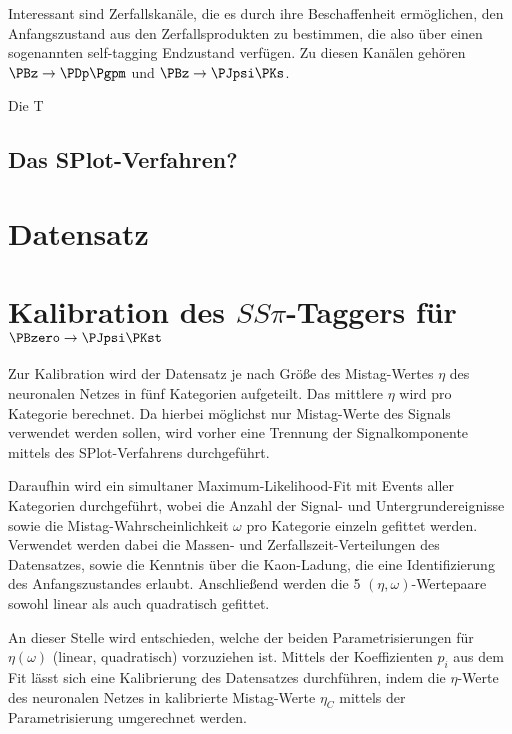 
Interessant sind Zerfallskanäle, die es durch ihre Beschaffenheit ermöglichen, den Anfangszustand aus den Zerfallsprodukten zu bestimmen, die also über einen sogenannten self-tagging Endzustand verfügen.
Zu diesen Kanälen gehören $\PBz \to \PDp\Pgpm$ und $\PBz \to \PJpsi \PKs$.

Die T


\subsection{Das SPlot-Verfahren?}

\section{Datensatz}


\section{\texorpdfstring{Kalibration des $SS\pi$-Taggers für $\PBzero \to \PJpsi \PKst$}{Kalibration des SSpi-Taggers für B0 -> JpsiKst}}

Zur Kalibration wird der Datensatz je nach Größe des Mistag-Wertes $\eta$ des neuronalen Netzes in fünf Kategorien aufgeteilt.
Das mittlere $η$ wird pro Kategorie berechnet.
Da hierbei möglichst nur Mistag-Werte des Signals verwendet werden sollen, wird vorher eine Trennung der Signalkomponente mittels des SPlot-Verfahrens durchgeführt.

Daraufhin wird ein simultaner Maximum-Likelihood-Fit mit Events aller Kategorien durchgeführt, wobei die Anzahl der Signal- und Untergrundereignisse sowie die Mistag-Wahrscheinlichkeit $\omega$ pro Kategorie einzeln gefittet werden.
Verwendet werden dabei die Massen- und Zerfallszeit-Verteilungen des Datensatzes, sowie die Kenntnis über die Kaon-Ladung, die eine Identifizierung des Anfangszustandes erlaubt.
Anschließend werden die 5 $(\eta, \omega)$-Wertepaare sowohl linear als auch quadratisch gefittet.

An dieser Stelle wird entschieden, welche der beiden Parametrisierungen für $\eta(\omega)$ (linear, quadratisch) vorzuziehen ist.
Mittels der Koeffizienten $p_i$ aus dem Fit lässt sich eine Kalibrierung des Datensatzes durchführen, indem die $η$-Werte des neuronalen Netzes in kalibrierte Mistag-Werte $η_C$ mittels der Parametrisierung umgerechnet werden.

